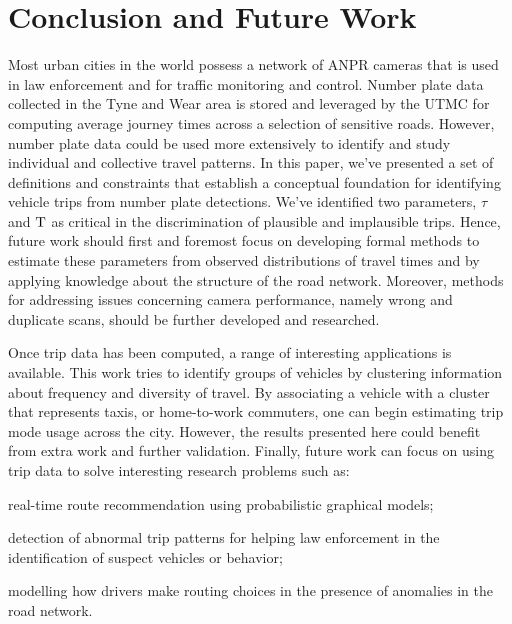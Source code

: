 \section{Conclusion and Future Work}\label{s.conclusions}

Most urban cities in the world possess a network of ANPR cameras that is used in law enforcement and for traffic monitoring and control. Number plate data collected in the Tyne and Wear area is stored and leveraged by the UTMC for computing average journey times across a selection of sensitive roads. However, number plate data could be used more extensively to identify and study individual and collective travel patterns. In this paper, we've presented a set of definitions and constraints that establish a conceptual foundation for identifying vehicle trips from number plate detections. We've identified two parameters, $\tau$ and $\mathrm{T}$ as critical in the discrimination of plausible and implausible trips. Hence, future work should first and foremost focus on developing formal methods to estimate these parameters from observed distributions of travel times and by applying knowledge about the structure of the road network. Moreover, methods for addressing issues concerning camera performance, namely wrong and duplicate scans, should be further developed and researched.

Once trip data has been computed, a range of interesting applications is available. This work tries to identify groups of vehicles by clustering information about frequency and diversity of travel. By associating a vehicle with a cluster that represents taxis, or home-to-work commuters, one can begin estimating trip mode usage across the city. However, the results presented here could benefit from extra work and further validation. Finally, future work can focus on using trip data to solve interesting research problems such as:
\begin{enumerate*}[label=(\roman*)]
  \item real-time route recommendation using probabilistic graphical models;
  \item detection of abnormal trip patterns for helping law enforcement in the identification of suspect vehicles or behavior;
  \item modelling how drivers make routing choices in the presence of anomalies in the road network.
\end{enumerate*}

